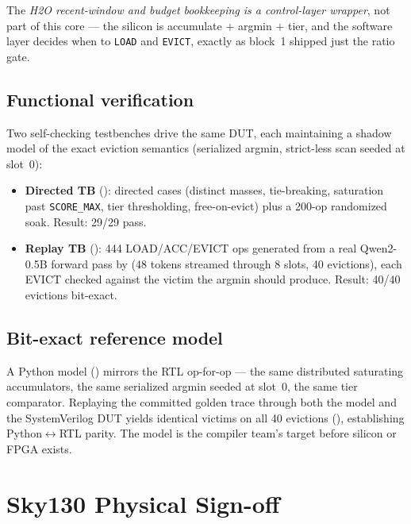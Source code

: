 \documentclass[10pt,twocolumn]{article}
\begin{document}
The \emph{H2O recent-window and budget bookkeeping is a control-layer wrapper},
not part of this core --- the silicon is accumulate $+$ argmin $+$ tier, and the
software layer decides when to \texttt{LOAD} and \texttt{EVICT}, exactly as
block~1 shipped just the ratio gate.

\subsection{Functional verification}

Two self-checking testbenches drive the same DUT, each maintaining a shadow model
of the exact eviction semantics (serialized argmin, strict-less scan seeded at
slot~0):
\begin{itemize}
  \item \textbf{Directed TB} (): directed cases
    (distinct masses, tie-breaking, saturation past \texttt{SCORE\_MAX}, tier
    thresholding, free-on-evict) plus a 200-op randomized soak. Result: 29/29 pass.
  \item \textbf{Replay TB} (): 444 LOAD/ACC/EVICT ops
    generated from a real Qwen2-0.5B forward pass by
     (48 tokens streamed through 8 slots,
    40 evictions), each EVICT checked against the victim the argmin should
    produce. Result: 40/40 evictions bit-exact.
\end{itemize}

\subsection{Bit-exact reference model}

A Python model () mirrors the RTL
op-for-op --- the same distributed saturating accumulators, the same serialized
argmin seeded at slot~0, the same tier comparator. Replaying the committed golden
trace through both the model and the SystemVerilog DUT yields identical victims on
all 40 evictions (), establishing Python$\leftrightarrow$RTL
parity. The model is the compiler team's target before silicon or FPGA exists.

\section{Sky130 Physical Sign-off}
\label{sec:sky130}
\end{document}
